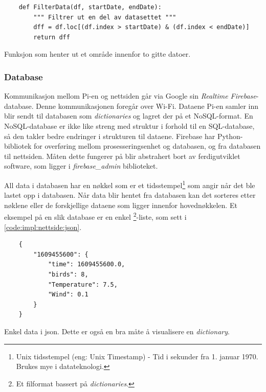\begin{listing}[!htb]
\begin{verbatim}
    def FilterData(df, startDate, endDate):
        """ Filtrer ut en del av datasettet """
        dff = df.loc[(df.index > startDate) & (df.index < endDate)]
        return dff
\end{verbatim}
\caption{Funksjon som henter ut et område innenfor to gitte datoer.}
\label{code:impl:nettside:sortering2}
\end{listing}


\subsubsection{Database}\label{sec:impl:nettside:database}

Kommunikasjon mellom Pi-en og nettsiden går via Google sin \textit{Realtime Firebase}-database. 
Denne kommunikasjonen foregår over Wi-Fi. 
Dataene Pi-en samler inn blir sendt til databasen som \textit{dictionaries} og lagret der på et NoSQL-format. 
En NoSQL-database er ikke like streng med struktur i forhold til en SQL-database, så den takler bedre endringer i strukturen til dataene. 
Firebase har Python-bibliotek for overføring mellom prosesseringsenhet og databasen, og fra databasen til nettsiden. 
Måten dette fungerer på blir abstrahert bort av ferdigutviklet software, som ligger i \textit{firebase\_admin} biblioteket.

All data i databasen har en nøkkel som er et tidsstempel\footnote{Unix tidsstempel (eng: Unix Timestamp) - Tid i sekunder fra 1. januar 1970. Brukes mye i datateknologi.} som angir når det ble lastet opp i databasen. 
Når data blir hentet fra databasen kan det sorteres etter nøklene eller de forskjellige dataene som ligger innenfor hovednøkkelen.
Et eksempel på en slik database er en enkel \footnote{Et filformat bassert på \textit{dictionaries}.}-liste, som sett i \autoref{code:impl:nettside:json}.

\begin{listing}[!htb]
    \begin{verbatim}
    {
        "1609455600": {
            "time": 1609455600.0, 
            "birds": 8, 
            "Temperature": 7.5, 
            "Wind": 0.1
        }  
    }
    \end{verbatim}
    \caption{Enkel data i json. Dette er også en bra måte å visualisere en \textit{dictionary}.}
    \label{code:impl:nettside:json}
\end{listing}

